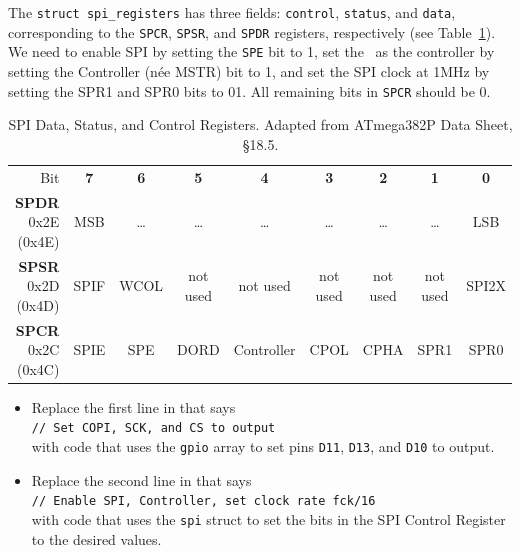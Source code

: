 The \lstinline{struct spi_registers} has three fields: \lstinline{control},
\lstinline{status}, and \lstinline{data}, corresponding to the \texttt{SPCR},
\texttt{SPSR}, and \texttt{SPDR} registers, respectively (see
Table~\ref{table:SPIregisters}). We need to enable SPI by setting the
\texttt{SPE} bit to 1, set the \nano\ as the controller by setting the
Controller (née MSTR) bit to 1, and set the SPI clock at 1MHz by setting the
SPR1 and SPR0 bits to 01. All remaining bits in \texttt{SPCR} should be 0.

\begin{table}
    \centering \small
    \begin{tabular}{|r||c|c|c|c|c|c|c|c||}
        \hline
        Bit                         & \textbf{7}    & \textbf{6}    & \textbf{5}    & \textbf{4}    & \textbf{3}    & \textbf{2}    & \textbf{1}    & \textbf{0}    \\ \cline{2-9} \cline{2-9}
        \textbf{SPDR} 0x2E (0x4E)   & MSB           & \dots         & \dots         & \dots         & \dots         & \dots         & \dots         & LSB           \\
        \textbf{SPSR} 0x2D (0x4D)   & SPIF          & WCOL          & not used      & not used      & not used      & not used      & not used      & SPI2X         \\
        \textbf{SPCR} 0x2C (0x4C)   & SPIE          & SPE           & DORD          & Controller    & CPOL          & CPHA          & SPR1          & SPR0          \\ \hline
    \end{tabular}
    \caption{SPI Data, Status, and Control Registers. \tiny Adapted from ATmega382P Data Sheet, §18.5. \label{table:SPIregisters}}
\end{table}

    \begin{itemize}
    \item Replace the first line in  that says
        \\ \phantom{sp} \lstinline{// Set COPI, SCK, and CS to output} \\ with
        code that uses the \lstinline{gpio} array to set pins \texttt{D11},
        \texttt{D13}, and \texttt{D10} to output.
    \item Replace the second line in  that says
        \\ \phantom{sp} \lstinline{// Enable SPI, Controller, set clock rate fck/16}
        \\ with code that uses the \lstinline{spi} struct to set the bits in
        the SPI Control Register to the desired values.
    \end{itemize}

